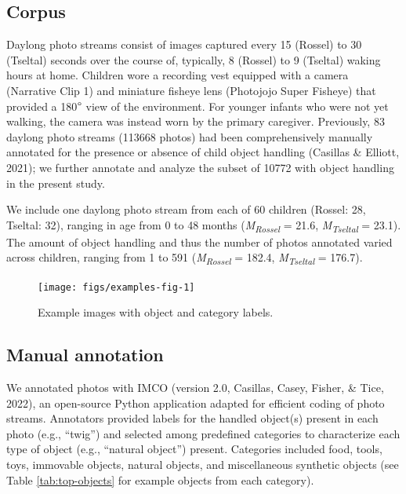 \documentclass[10pt, letterpaper]{article}
\newenvironment{CodeChunk}{}{}
\begin{document}
\hypertarget{corpus}{%
\subsection{Corpus}\label{corpus}}

Daylong photo streams consist of images captured every 15 (Rossel) to 30
(Tseltal) seconds over the course of, typically, 8 (Rossel) to 9
(Tseltal) waking hours at home. Children wore a recording vest equipped
with a camera (Narrative Clip 1) and miniature fisheye lens (Photojojo
Super Fisheye) that provided a 180\(\text{\textdegree}\) view of the
environment. For younger infants who were not yet walking, the camera
was instead worn by the primary caregiver. Previously, 83 daylong photo
streams (113668 photos) had been comprehensively manually annotated for
the presence or absence of child object handling (Casillas \& Elliott,
2021); we further annotate and analyze the subset of 10772 with object
handling in the present study.

We include one daylong photo stream from each of 60 children (Rossel:
28, Tseltal: 32), ranging in age from 0 to 48 months
(\emph{M}\textsubscript{\emph{Rossel}} = 21.6,
\emph{M}\textsubscript{\emph{Tseltal}} = 23.1). The amount of object
handling and thus the number of photos annotated varied across children,
ranging from 1 to 591 (\emph{M}\textsubscript{\emph{Rossel}} = 182.4,
\emph{M}\textsubscript{\emph{Tseltal}} = 176.7).

\begin{CodeChunk}
\begin{figure}[h]

{\centering \texttt{[image: figs/examples-fig-1]} 

}

\caption[Example images with object and category labels]{Example images with object and category labels.}\label{fig:examples-fig}
\end{figure}
\end{CodeChunk}

\hypertarget{manual-annotation}{%
\subsection{Manual annotation}\label{manual-annotation}}

We annotated photos with IMCO (version 2.0, Casillas, Casey, Fisher, \&
Tice, 2022), an open-source Python application adapted for efficient
coding of photo streams. Annotators provided labels for the handled
object(s) present in each photo (e.g., ``twig'') and selected among
predefined categories to characterize each type of object (e.g.,
``natural object'') present. Categories included food, tools, toys,
immovable objects, natural objects, and miscellaneous synthetic objects
(see Table \ref{tab:top-objects} for example objects from each
category).
\end{document}
